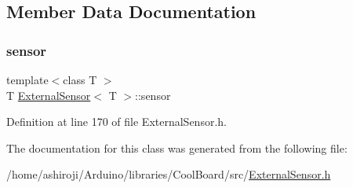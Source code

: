 \subsection{Member Data Documentation}
\mbox{\label{class_external_sensor_a6e1f518119abe08c14b498ce24a7e1b3}} 
\subsubsection{\texorpdfstring{sensor}{sensor}}
{\footnotesize\ttfamily template$<$class T $>$ \\
T \hyperlink{class_external_sensor}{External\+Sensor}$<$ T $>$\+::sensor\hspace{0.3cm}{\ttfamily [private]}}



Definition at line 170 of file External\+Sensor.\+h.



The documentation for this class was generated from the following file\+:\begin{DoxyCompactItemize}
\item 
/home/ashiroji/\+Arduino/libraries/\+Cool\+Board/src/\hyperlink{_external_sensor_8h}{External\+Sensor.\+h}\end{DoxyCompactItemize}
